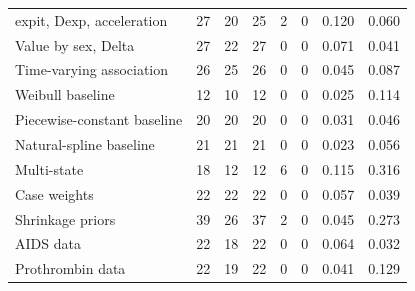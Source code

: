 \begin{longtable}{lrrrrrrr}
expit, Dexp, acceleration & 27 & 20 & 25 & 2 & 0 & 0.120 & 0.060 \\
Value by sex, Delta & 27 & 22 & 27 & 0 & 0 & 0.071 & 0.041 \\
Time-varying association & 26 & 25 & 26 & 0 & 0 & 0.045 & 0.087 \\
Weibull baseline & 12 & 10 & 12 & 0 & 0 & 0.025 & 0.114 \\
Piecewise-constant baseline & 20 & 20 & 20 & 0 & 0 & 0.031 & 0.046 \\
Natural-spline baseline & 21 & 21 & 21 & 0 & 0 & 0.023 & 0.056 \\
Multi-state & 18 & 12 & 12 & 6 & 0 & 0.115 & 0.316 \\
Case weights & 22 & 22 & 22 & 0 & 0 & 0.057 & 0.039 \\
Shrinkage priors & 39 & 26 & 37 & 2 & 0 & 0.045 & 0.273 \\
AIDS data & 22 & 18 & 22 & 0 & 0 & 0.064 & 0.032 \\
Prothrombin data & 22 & 19 & 22 & 0 & 0 & 0.041 & 0.129 \\
\end{longtable}
\endgroup
